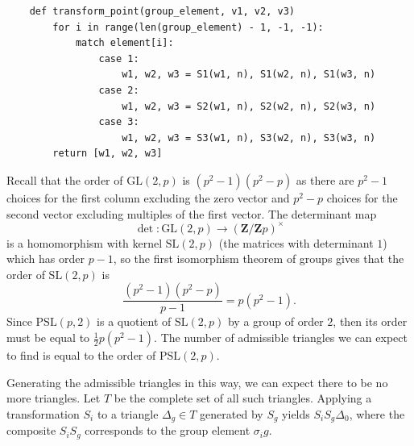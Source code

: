 \documentclass{article}
\begin{document}
\begin{verbatim}
    def transform_point(group_element, v1, v2, v3)
        for i in range(len(group_element) - 1, -1, -1):
            match element[i]:
                case 1:
                    w1, w2, w3 = S1(w1, n), S1(w2, n), S1(w3, n)
                case 2:
                    w1, w2, w3 = S2(w1, n), S2(w2, n), S2(w3, n)
                case 3:
                    w1, w2, w3 = S3(w1, n), S3(w2, n), S3(w3, n)
        return [w1, w2, w3]
\end{verbatim}

Recall that the order of \(\mathrm{GL}(2,p)\) is \((p^2 - 1)(p^2 - p)\) as there are \(p^2 - 1\) choices for the first column excluding the zero vector and \(p^2 - p\) choices for the second vector excluding multiples of the first vector. The determinant map 
\[ \det: \mathrm{GL}(2,p) \to (\mathbf{Z}/\mathbf{Z}p)^\times \]
is a homomorphism with kernel \(\mathrm{SL}(2,p)\) (the matrices with determinant \(1\)) which has order \(p-1\), so the first isomorphism theorem of groups gives that the order of \(\mathrm{SL}(2,p)\) is 
\[ \frac{(p^2 - 1)(p^2-p)}{p-1}  = p(p^2-1). \]
Since \(\mathrm{PSL}(p,2)\) is a quotient of \(\mathrm{SL}(2,p)\) by a group of order \(2\), then its order must be equal to \(\frac{1}{2} p(p^2-1)\). The number of admissible triangles we can expect to find is equal to the order of \(\mathrm{PSL}(2,p)\).

Generating the admissible triangles in this way, we can expect there to be no more triangles. Let \(T\) be the complete set of all such triangles. Applying a transformation \(S_i\) to a triangle \(\Delta_g \in T\) generated by \(S_g\) yields \(S_iS_g\Delta_0\), where the composite \(S_iS_g\) corresponds to the group element \(\sigma_ig\).
\end{document}

